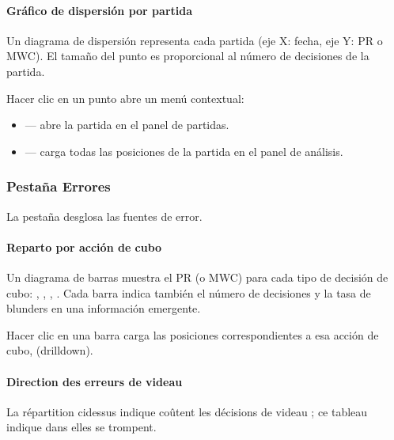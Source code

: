 \documentclass[letterpaper,10pt,spanish]{sphinxmanual}
\begin{document}
\paragraph{Gráfico de dispersión por partida}
\label{\detokenize{manuel:scatter-plot-par-match}}
\sphinxAtStartPar
Un diagrama de dispersión representa cada partida (eje X: fecha, eje Y: PR o MWC). El tamaño del punto es proporcional al número de decisiones de la partida.

\sphinxAtStartPar
Hacer clic en un punto abre un menú contextual:
\begin{itemize}
\item {} 
\sphinxAtStartPar
{} — abre la partida en el panel de partidas.

\item {} 
\sphinxAtStartPar
{} — carga todas las posiciones de la partida en el panel de análisis.

\end{itemize}


\subsubsection{Pestaña Errores}
\label{\detokenize{manuel:onglet-erreurs}}
\sphinxAtStartPar
La pestaña  desglosa las fuentes de error.


\paragraph{Reparto por acción de cubo}
\label{\detokenize{manuel:repartition-par-action-de-videau}}
\sphinxAtStartPar
Un diagrama de barras muestra el PR (o MWC) para cada tipo de decisión de cubo: , , , . Cada barra indica también el número de decisiones y la tasa de blunders en una información emergente.

\sphinxAtStartPar
Hacer clic en una barra carga las posiciones correspondientes a esa acción de cubo,  (drill\sphinxhyphen{}down).


\paragraph{Direction des erreurs de videau}
\label{\detokenize{manuel:direction-des-erreurs-de-videau}}
\sphinxAtStartPar
La répartition ci\sphinxhyphen{}dessus indique  coûtent les décisions de videau ;
ce tableau indique dans  elles se trompent.
\end{document}
